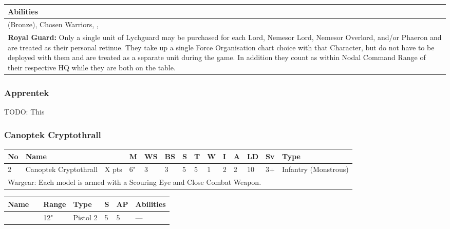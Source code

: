 \noindent
\begin{tabular}{||m{532pt}||}
	\hline
	Abilities \\
	\hline
	\quickref{Awakening Protocols} (Bronze), Chosen Warriors, \quickref{Living Metal}, \quickref{Reanimation Protocols} \\
	\textbf{Royal Guard:} Only a single unit of Lychguard may be purchased for each Lord, Nemesor Lord, Nemesor Overlord, and/or Phaeron and are treated as their personal retinue. They take up a single Force Organisation chart choice with that Character, but do not have to be deployed with them and are treated as a separate unit during the game. In addition they count as within Nodal Command Range of their respective HQ while they are both on the table. \\
	\hline
\end{tabular}


\newpage
\subsubsection{Apprentek}

TODO: This


\newpage
\subsubsection{Canoptek Cryptothrall}

\noindent
\begin{tabular}{||m{10pt} m{95pt} m{30pt} m{11pt} m{11pt} m{11pt} m{11pt} m{11pt} m{11pt} m{11pt} m{11pt} m{11pt} m{11pt} m{125pt}||}
	\hline
	No & Name & & M & WS & BS & S & T & W & I & A & LD & Sv & Type \\
	\hline
	2 & Canoptek Cryptothrall & X pts & 6" & 3 & 3 & 5 & 5 & 1 & 2 & 2 & 10 & 3+ & Infantry (Monstrous) \\
	\hline
	\hline
	\multicolumn{14}{||Z{532 pt}||}{Wargear: Each model is armed with a Scouring Eye and Close Combat Weapon.} \\
	\hline
\end{tabular}

\noindent
\begin{tabular}{||m{110pt} m{30pt} m{31pt} m{55pt} m{12pt} m{12pt} m{210pt}||}
	\hline
	Name & & Range & Type & S & AP & Abilities \\
	\hline
	\quickref{Scouring Eye} & & 12" & Pistol 2 & 5 & 5 & — \\
	\hline
\end{tabular}

